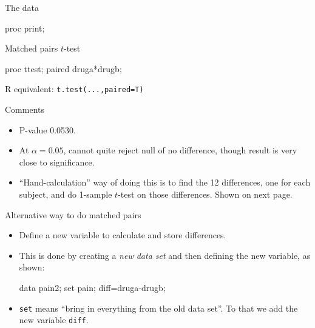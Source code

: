 \documentclass[unknownkeysallowed]{beamer}\usepackage[]{graphicx}\usepackage[]{color}
\begin{document}
\begin{frame}[fragile]{The data}
  
  \begin{Sascode}[store=iz]
proc print;    
  \end{Sascode}
  
  
\end{frame}

\begin{frame}[fragile]{Matched pairs $t$-test}

  \begin{Sascode}[store=ic]
proc ttest;
  paired druga*drugb;
\end{Sascode}


R equivalent: \texttt{t.test(...,paired=T)}

\end{frame}

\begin{frame}[fragile]{Comments}


  \begin{itemize}
  \item P-value 0.0530. 
  \item At $\alpha=0.05$, cannot quite reject null of no
difference, though result is very close to significance.
\item ``Hand-calculation'' way of doing this is to find the 12
  differences, one for each subject, and do 1-sample $t$-test on those
  differences. Shown on next page.
  \end{itemize}
  
\end{frame}

\begin{frame}[fragile]{Alternative way to do matched pairs}

  \begin{itemize}
  \item Define a new variable to calculate and store differences.
  \item This is done by creating a \emph{new data set} and then
    defining the new variable, as shown:
\begin{Datastep}
data pain2;
  set pain;
  diff=druga-drugb;  
\end{Datastep}

\item \texttt{set} means ``bring in everything from the old data
  set''. To that we add the new variable \texttt{diff}.
  \end{itemize}
  
  
  

\end{frame}
\end{document}
